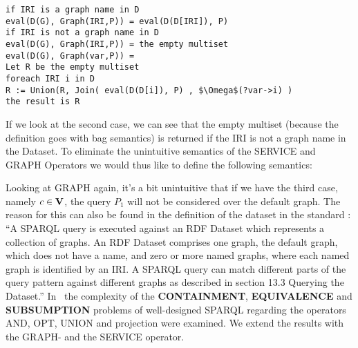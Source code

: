 \begin{lstlisting}
if IRI is a graph name in D
eval(D(G), Graph(IRI,P)) = eval(D(D[IRI]), P)
if IRI is not a graph name in D
eval(D(G), Graph(IRI,P)) = the empty multiset
eval(D(G), Graph(var,P)) =
Let R be the empty multiset
foreach IRI i in D
R := Union(R, Join( eval(D(D[i]), P) , $\Omega$(?var->i) )
the result is R
\end{lstlisting}

If we look at the second case, we can see that the empty multiset (because the
definition goes with bag semantics)
is returned if the IRI is not a graph name in the Dataset. 
To eliminate the unintuitive semantics of the SERVICE and GRAPH Operators we
would thus like to define the following semantics:\\

Looking at GRAPH again, it's a bit unintuitive that if we have
the third case, namely $c \in \mathbf{V}$, the query $P_1$ will not be considered over the
default graph. The reason for this can also be found in the definition of the
dataset in the standard \cite{w3standard}:
``A SPARQL query is executed against an RDF Dataset which represents a collection
of graphs. An RDF Dataset comprises one graph, the default graph, which does not
have a name, and zero or more named graphs, where each named graph is identified
by an IRI. A SPARQL query can match different parts of the query pattern against
different graphs as described in section 13.3 Querying the Dataset.''
In~\cite{pichler2014containment} the complexity of the \textbf{CONTAINMENT},
\textbf{EQUIVALENCE} and \textbf{SUBSUMPTION}
problems of well-designed SPARQL regarding the operators AND, OPT, UNION and 
projection were examined.  We extend the results with the GRAPH- and the SERVICE
operator. 
